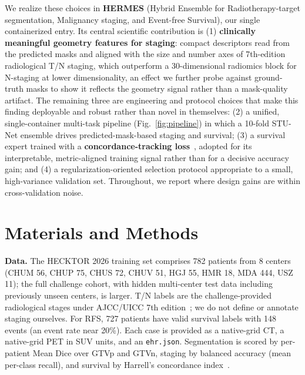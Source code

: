 \documentclass[runningheads]{llncs}
\begin{document}
We realize these choices in \textbf{HERMES} (Hybrid Ensemble for Radiotherapy-target segmentation, Malignancy staging, and Event-free Survival), our single containerized entry. Its central scientific contribution is (1) \textbf{clinically meaningful geometry features for staging}: compact descriptors read from the predicted masks and aligned with the size and number axes of 7th-edition radiological T/N staging, which outperform a 30-dimensional radiomics block for N-staging at lower dimensionality, an effect we further probe against ground-truth masks to show it reflects the geometry signal rather than a mask-quality artifact. The remaining three are engineering and protocol choices that make this finding deployable and robust rather than novel in themselves: (2) a unified, single-container multi-task pipeline (Fig.~\ref{fig:pipeline}) in which a 10-fold STU-Net ensemble drives predicted-mask-based staging and survival; (3) a survival expert trained with a \textbf{concordance-tracking loss}~\cite{ref14}, adopted for its interpretable, metric-aligned training signal rather than for a decisive accuracy gain; and (4) a regularization-oriented selection protocol appropriate to a small, high-variance validation set. Throughout, we report where design gains are within cross-validation noise.

\section{Materials and Methods}

\textbf{Data.} The HECKTOR 2026 training set comprises 782 patients from 8 centers (CHUM 56, CHUP 75, CHUS 72, CHUV 51, HGJ 55, HMR 18, MDA 444, USZ 11); the full challenge cohort, with hidden multi-center test data including previously unseen centers, is larger. T/N labels are the challenge-provided radiological stages under AJCC/UICC 7th edition~\cite{ref15}; we do not define or annotate staging ourselves. For RFS, 727 patients have valid survival labels with 148 events (an event rate near 20\%). Each case is provided as a native-grid CT, a native-grid PET in SUV units, and an \texttt{ehr.json}. Segmentation is scored by per-patient Mean Dice over GTVp and GTVn, staging by balanced accuracy (mean per-class recall), and survival by Harrell's concordance index~\cite{ref16,ref17}.
\end{document}
